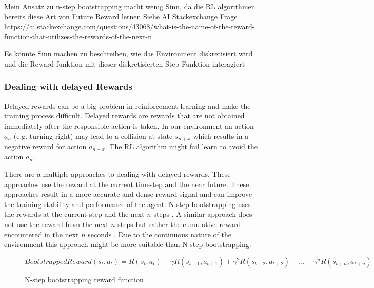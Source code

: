 

Mein Ansatz zu n-step bootstrapping macht wenig Sinn, da die RL algorithmen bereits diese Art von Future Reward lernen
Siehe AI Stackexchange Frage https://ai.stackexchange.com/questions/43068/what-is-the-name-of-the-reward-function-that-utilizes-the-rewards-of-the-next-n

Es könnte Sinn machen zu beschreiben, wie das Environment diskretisiert wird und die Reward funktion mit dieser diskretisierten Step Funktion interagiert

\subsubsection{Dealing with delayed Rewards}
Delayed rewards can be a big problem in reinforcement learning and make the training process difficult. Delayed rewards are rewards that are not obtained immediately after the responsible action is taken. In our environment an action \(a_n\) (e.g. turning right) may lead to a collision at state \(s_{n+x}\) which results in a negative reward for action \(a_{n+x}\). The RL algorithm might fail learn to avoid the action \(a_n\).

There are a multiple approaches to dealing with delayed rewards. These approaches use the reward at the current timestep and the near future. These approaches result in a more accurate and dense reward signal and can improve the training stability and performance of the agent.
N-step bootstrapping uses the rewards at the current step and the next \(n\) steps \autocite{nstepbootstrapping}.
A similar approach does not use the reward from the next \(n\) steps but rather the cumulative reward encountered in the next \(n\) seconds \autocite{trackmania}. Due to the continuous nature of the environment this approach might be more suitable than N-step bootstrapping.

\begin{figure}
     \[BootstrappedReward(s_t,a_t) = R(s_t,a_t) + \gamma R(s_{t+1},a_{t+1}) + \gamma^2 R(s_{t+2},a_{t+2}) + ... + \gamma^n R(s_{t+n},a_{t+n})\]
     \caption{N-step bootstrapping reward function \autocite{nstepbootstrapping}}
\end{figure}
\fi


